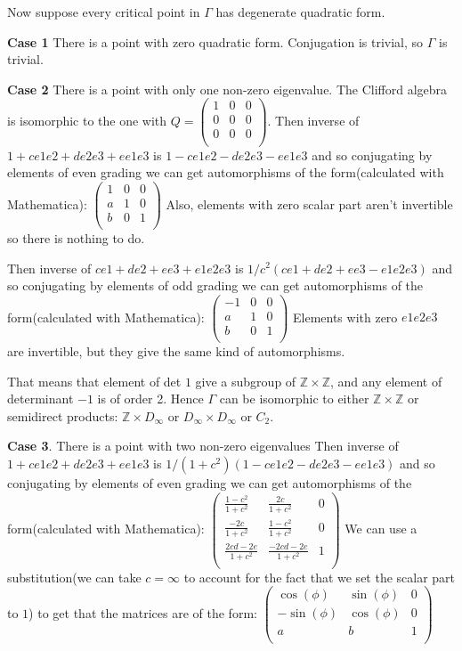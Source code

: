 \documentclass[a4paper]{article}
\begin{document}
Now suppose every critical point in $\Gamma$ has degenerate quadratic form.


\textbf{Case 1} There is a point with zero quadratic form.
Conjugation is trivial, so $\Gamma$ is trivial.

\textbf{Case 2} There is a point with only one non-zero eigenvalue.
The Clifford algebra is isomorphic to the one with $Q= \begin{pmatrix}
	1 & 0 &0 \\ 
	0 & 0 &0\\
	0 & 0 &0\\
\end{pmatrix}$.
Then inverse of $1+c e1e2+d e2e3+ e e1e3$ is $1-c e1e2-d e2e3- e e1e3$ and so conjugating by elements of even grading we can get automorphisms of the form(calculated with Mathematica):
$ \begin{pmatrix}
1 & 0 &0 \\ 
a & 1 & 0\\
b & 0 &  1\\
\end{pmatrix}$
Also, elements with zero scalar part aren't invertible so there is nothing to do.

Then inverse of $ce1+de2+ e e3+ e1e2e3$ is $1/c^2(ce1+de2+ e e3- e1e2e3)$ and so conjugating by elements of odd grading we can get automorphisms of the form(calculated with Mathematica):
$ \begin{pmatrix}
-1 & 0 &0 \\ 
a & 1 & 0\\
b & 0 &  1\\
\end{pmatrix}$
Elements with zero $e1e2e3$ are invertible, but they give the same kind of automorphisms.

That means that element of det $1$ give a subgroup of $\mathbb{Z} \times \mathbb{Z}$, and any element of determinant $-1$ is of order 2.
Hence $\Gamma$ can be isomorphic to either $\mathbb{Z} \times \mathbb{Z}$ or semidirect products: $\mathbb{Z} \times D_\infty$ or $D_\infty \times D_\infty$ or $C_2$.

\textbf{Case 3}. There is a point with two non-zero eigenvalues
Then inverse of $1+c e1e2+d e2e3+ e e1e3$ is $1/(1+c^2)(1-c e1e2-d e2e3- e e1e3)$ and so conjugating by elements of even grading we can get automorphisms of the form(calculated with Mathematica):
$\begin{pmatrix}
\frac{1-c^2}{1+c^2} & \frac{2c}{1+c^2} &0 \\ 
\frac{-2c}{1+c^2} & \frac{1-c^2}{1+c^2} & 0\\
\frac{2cd-2e}{1+c^2} & \frac{-2cd-2e}{1+c^2} &  1\\
\end{pmatrix}$
We can use a substitution(we can take $c=\infty$ to account for the fact that we set the scalar part to $1$) to get that the matrices are of the form:
$\begin{pmatrix}
\cos(\phi) & \sin(\phi) &0 \\ 
-\sin(\phi) & \cos(\phi) & 0\\
a & b &  1\\
\end{pmatrix}$
\end{document}
